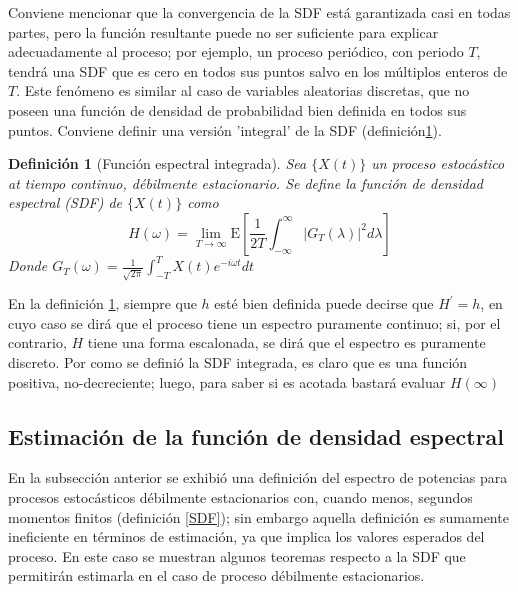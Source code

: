 \documentclass[12pt,a4paper]{mitthesis}
\newtheorem{defn}{Definici\'on}
\newcommand{\intR}{\int_{-\infty}^{\infty}}
\newcommand{\prima}{^{\prime}}
\newcommand{\E}[1]{\mathrm{E}\left[ #1 \right]}
\newcommand{\abso}[1]{\left| #1 \right|}
\begin{document}
Conviene mencionar que la convergencia de la SDF est\'a garantizada casi en todas partes, pero la
funci\'on resultante puede no ser suficiente para explicar adecuadamente al proceso; por ejemplo, 
un proceso peri\'odico, con periodo $T$, tendr\'a una SDF que es cero en todos sus puntos salvo en 
los m\'ultiplos enteros de $T$.
Este fen\'omeno es similar al caso de variables aleatorias discretas, que no poseen una funci\'on 
de densidad de probabilidad bien definida en todos sus puntos.
Conviene definir una versi\'on 'integral' de la SDF (definici\'on\ref{SDF_integrado}).

\begin{defn}[Funci\'on espectral integrada]
Sea $\{X(t)\}$ un proceso estoc\'astico at tiempo continuo, d\'ebilmente estacionario. Se define la 
funci\'on de densidad espectral (SDF) de $\{X(t)\}$ como
\begin{equation*}
H(\omega) = \lim_{T\rightarrow \infty} 
\E{ \frac{1}{2 T} \intR \abso{G_T(\lambda)}^{2} d\lambda }
\end{equation*}
Donde $G_T (\omega) = \frac{1}{\sqrt{2 \pi}} \int_{-T}^{T} X(t) e^{-i \omega t} dt$
\label{SDF_integrado}
\end{defn}

En la definici\'on \ref{SDF_integrado}, siempre que $h$ est\'e bien definida puede decirse que 
$H\prima= h$, en cuyo caso se dir\'a que el proceso tiene un espectro puramente continuo; si, por 
el contrario, $H$ tiene una forma escalonada, se dir\'a que el espectro es puramente discreto.
Por como se defini\'o la SDF integrada, es claro que es una funci\'on positiva, no-decreciente;
luego, para saber si es acotada bastar\'a evaluar $H(\infty)$


\subsection{Estimaci\'on de la funci\'on de densidad espectral}

En la subsecci\'on anterior se exhibi\'o una definici\'on del espectro de potencias para 
procesos estoc\'asticos d\'ebilmente estacionarios con, cuando menos, segundos momentos finitos 
(definici\'on \ref{SDF}); sin embargo aquella definici\'on es sumamente ineficiente en 
t\'erminos de estimaci\'on, ya que implica los valores esperados del proceso.
En este caso se muestran algunos teoremas respecto a la SDF que permitir\'an estimarla en el caso 
de proceso d\'ebilmente estacionarios.
\end{document}

